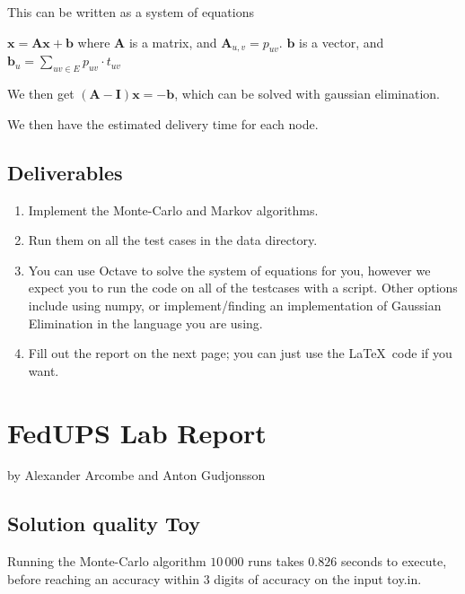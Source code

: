 \documentclass{tufte-handout}
\begin{document}
This can be written as a system of equations

$\bm{x} = \bm{Ax} + \bm{b}$
where $\bm{A}$ is a matrix, and $\bm{A}_{u,v} = p_{uv}$. $\bm{b}$ is a vector, and $\bm{b}_u = \sum_{uv \in E}{p_{uv}\cdot t_{uv}}$

We then get $(\bm{A}-\bm{I})\bm{x} = -\bm{b}$, which can be solved with gaussian elimination.

We then have the estimated delivery time for each node.

\subsection{Deliverables}

\begin{enumerate}
\item Implement the Monte-Carlo and Markov algorithms.
\item Run them on all the test cases in the data directory.
\item You can use Octave to solve the system of equations for you, 
    however we expect you to run the code on all of the testcases with a script.
    Other options include using numpy, or implement/finding an implementation of
        Gaussian Elimination in the language you are using.
\item Fill out the report on the next page; you can just use the
  \LaTeX\ code if you want.
\end{enumerate}

\newpage


\newpage
\section{FedUPS Lab Report}


by Alexander Arcombe and Anton Gudjonsson


\subsection{Solution quality Toy}

Running the Monte-Carlo algorithm $10\,000$ runs takes $0.826$ seconds to execute, before reaching an accuracy within $3$ digits
of accuracy on the input toy.in.
\end{document}
